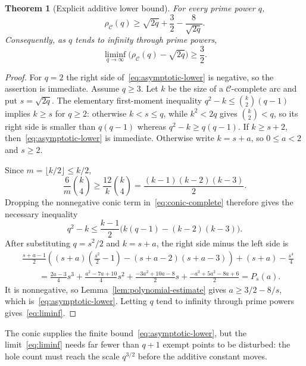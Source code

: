 \documentclass[11pt]{article}
\newtheorem{theorem}{Theorem}[section]
\theoremstyle{definition}
\theoremstyle{remark}
\newcommand{\cC}{\mathcal{C}}
\newcommand{\rhoC}{\rho_{\cC}}
\begin{document}
\begin{theorem}[Explicit additive lower bound]
\label{thm:asymptotic}
For every prime power $q$,
\begin{equation}
 \boxed{\displaystyle
 \rhoC(q)\ge\sqrt{2q}+\frac32-\frac8{\sqrt{2q}}.}
\label{eq:asymptotic-lower}
\end{equation}
Consequently, as $q$ tends to infinity through prime powers,
\begin{equation}
 \liminf_{q\to\infty}
 \bigl(\rhoC(q)-\sqrt{2q}\bigr)\ge\frac32.
\label{eq:liminf}
\end{equation}
\end{theorem}

\begin{proof}
For \(q=2\) the right side of~\eqref{eq:asymptotic-lower} is negative, so
the assertion is immediate.  Assume \(q\ge3\).
Let $k$ be the size of a $\cC$-complete arc and put $s=\sqrt{2q}$.
The elementary first-moment inequality
$q^2-k\le\binom{k}{2}(q-1)$ implies $k\ge s$ for $q\ge2$:
otherwise $k<s\le q$, while $k^2<2q$ gives
$\binom{k}{2}<q$, so its right side is smaller than $q(q-1)$ whereas
$q^2-k\ge q(q-1)$.
If $k\ge s+2$, then~\eqref{eq:asymptotic-lower} is immediate.  Otherwise
write $k=s+a$, so $0\le a<2$ and $s\ge2$.

Since $m=\lfloor k/2\rfloor\le k/2$,
\[
 \frac6m\binom{k}{4}
 \ge\frac{12}{k}\binom{k}{4}
 =\frac{(k-1)(k-2)(k-3)}2.
\]
Dropping the nonnegative conic term in~\eqref{eq:conic-complete} therefore
gives the necessary inequality
\[
 q^2-k\le
 \frac{k-1}{2}\bigl(k(q-1)-(k-2)(k-3)\bigr).
\]
After substituting $q=s^2/2$ and $k=s+a$, the right side minus the left
side is
\begin{align*}
&\frac{s+a-1}{2}
 \left((s+a)\left(\frac{s^2}{2}-1\right)
 -(s+a-2)(s+a-3)\right)
 +(s+a)-\frac{s^4}{4}\\
&\qquad=
 \frac{2a-3}{4}s^3
 +\frac{a^2-7a+10}{4}s^2
 +\frac{-3a^2+10a-8}{2}s
 +\frac{-a^3+5a^2-8a+6}{2}
 =P_s(a).
\end{align*}
It is nonnegative, so
Lemma~\ref{lem:polynomial-estimate} gives
$a\ge3/2-8/s$, which is~\eqref{eq:asymptotic-lower}.  Letting $q$ tend to
infinity through prime powers gives~\eqref{eq:liminf}.
\end{proof}

The conic supplies the finite bound~\eqref{eq:asymptotic-lower}, but the
limit~\eqref{eq:liminf} needs far fewer than $q+1$ exempt points to be
disturbed: the hole count must reach the scale $q^{3/2}$ before the
additive constant moves.
\end{document}
